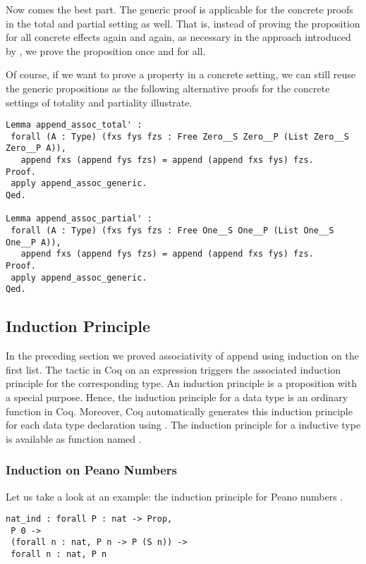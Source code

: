 Now comes the best part.
The generic proof is applicable for the concrete proofs in the total
and partial setting as well.
That is, instead of proving the proposition for all concrete effects
again and again, as necessary in the approach introduced by
\citet{abel2005verifying}, we prove the proposition once and for all.

Of course, if we want to prove a property in a concrete setting, we
can still reuse the generic propositions as the following alternative
proofs for the concrete settings of totality and partiality
illustrate.

\begin{verbatim}
Lemma append_assoc_total' :
 forall (A : Type) (fxs fys fzs : Free Zero__S Zero__P (List Zero__S Zero__P A)),
   append fxs (append fys fzs) = append (append fxs fys) fzs.
Proof.
 apply append_assoc_generic.
Qed.

Lemma append_assoc_partial' :
 forall (A : Type) (fxs fys fzs : Free One__S One__P (List One__S One__P A)),
   append fxs (append fys fzs) = append (append fxs fys) fzs.
Proof.
 apply append_assoc_generic.
Qed.
\end{verbatim}

\subsection{Induction Principle}

In the preceding section we proved associativity of append using
induction on the first list.
The  tactic in Coq on an expression triggers the
associated induction principle for the corresponding type.
An induction principle is a proposition with a special
purpose.
Hence, the induction principle for a data type is an ordinary function
in Coq.
Moreover, Coq automatically generates this induction principle for
each data type declaration using .
The induction principle for a inductive type  is available as
function named .

\subsubsection{Induction on Peano Numbers}
Let us take a look at an example: the induction principle for Peano
numbers .

\begin{verbatim}
nat_ind : forall P : nat -> Prop,
 P 0 ->
 (forall n : nat, P n -> P (S n)) ->
 forall n : nat, P n
\end{verbatim}

